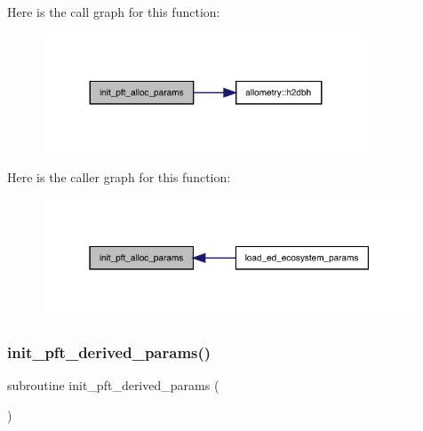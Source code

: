 Here is the call graph for this function\+:
\nopagebreak
\begin{figure}[H]
\begin{center}
\leavevmode
\includegraphics[width=275pt]{ed__params_8f90_a3e351a017b9f9f9ef7843e9f7041be82_cgraph}
\end{center}
\end{figure}
Here is the caller graph for this function\+:
\nopagebreak
\begin{figure}[H]
\begin{center}
\leavevmode
\includegraphics[width=315pt]{ed__params_8f90_a3e351a017b9f9f9ef7843e9f7041be82_icgraph}
\end{center}
\end{figure}
\mbox{\label{ed__params_8f90_a21ff8ff0bd1d75c0aa63e325b69234c4}} 
\subsubsection{\texorpdfstring{init\+\_\+pft\+\_\+derived\+\_\+params()}{init\_pft\_derived\_params()}}
{\footnotesize\ttfamily subroutine init\+\_\+pft\+\_\+derived\+\_\+params (\begin{DoxyParamCaption}{ }\end{DoxyParamCaption})}

